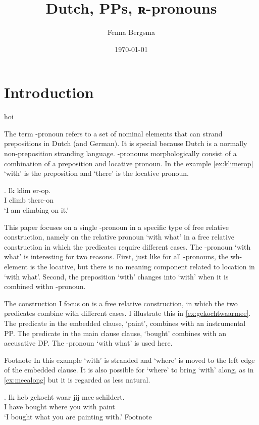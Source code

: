 \documentclass{article}
\title{Dutch, PPs, ʀ-pronouns}
\author{Fenna Bergsma}
\date{\today}
\begin{document}
\maketitle




\section{Introduction}

hoi

The term -pronoun \citep{riemsdijk1978} refers to a set of nominal elements that can strand prepositions in Dutch (and German). It is special because Dutch is a normally non-preposition stranding language. -pronouns morphologically consist of a combination of a preposition and locative pronoun. In the example \ref{ex:klimerop}  `with' is the preposition and  `there' is the locative pronoun.

\exg. Ik klim er-op.\\
 I climb there-on\\
 `I am climbing on it.'\label{ex:klimerop}

This paper focuses on a single -pronoun in a specific type of free relative construction, namely on the relative pronoun  `with what' in a free relative construction in which the predicates require different cases. The -pronoun  `with what' is interesting for two reasons. First, just like for all -pronouns, the wh-element is the locative, but there is no meaning component related to location in `with what'. Second, the preposition  `with' changes into  `with' when it is combined withn -pronoun.

The construction I focus on is a free relative construction, in which the two predicates combine with different cases. I illustrate this in \ref{ex:gekochtwaarmee}. The predicate in the embedded clause,  `paint', combines with an instrumental PP. The predicate in the main clause clause,  `bought' combines with an accusative DP. The -pronoun  `with what' is used here.


Footnote
In this example  `with' is stranded and  `where' is moved to the left edge of the embedded clause. It is also possible for  `where' to bring  `with' along, as in \ref{ex:meealong} but it is regarded as less natural.

\exg. Ik heb gekocht waar jij mee schildert.\\
 I have bought where you with paint\\
 `I bought what you are painting with.'\label{ex:meealong}
Footnote
\end{document}
